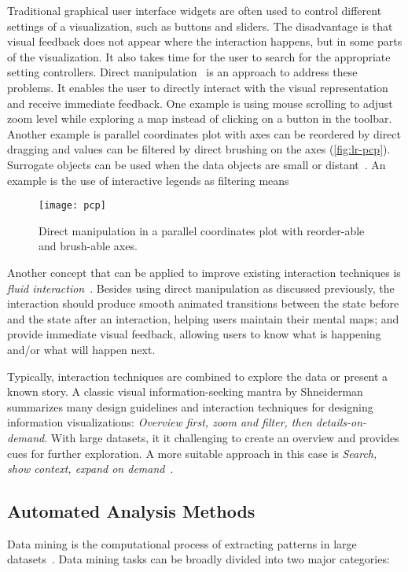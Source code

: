 Traditional graphical user interface widgets are often used to control different settings of a visualization, such as buttons and sliders. The disadvantage is that visual feedback does not appear where the interaction happens, but in some parts of the visualization. It also takes time for the user to search for the appropriate setting controllers. Direct manipulation~\cite{Shneiderman1982} is an approach to address these problems. It enables the user to directly interact with the visual representation and receive immediate feedback. One example is using mouse scrolling to adjust zoom level while exploring a map instead of clicking on a button in the toolbar. Another example is parallel coordinates plot with axes can be reordered by direct dragging and values can be filtered by direct brushing on the axes (\autoref{fig:lr-pcp}). Surrogate objects can be used when the data objects are small or distant~\cite{Kwon2011}. An example is the use of interactive legends as filtering means~\cite{Riche2010b}

\begin{figure}[!htb]
	\centering
	\texttt{[image: pcp]}
	\caption{Direct manipulation in a parallel coordinates plot with reorder-able and brush-able axes.}
	\label{fig:lr-pcp}
\end{figure}

Another concept that can be applied to improve existing interaction techniques is \emph{fluid interaction}~\cite{Elmqvist2011}. Besides using direct manipulation as discussed previously, the interaction should produce smooth animated transitions between the state before and the state after an interaction, helping users maintain their mental maps; and provide immediate visual feedback, allowing users to know what is happening and/or what will happen next.

Typically, interaction techniques are combined to explore the data or present a known story. A classic visual information-seeking mantra by Shneiderman~\cite{Shneiderman1996} summarizes many design guidelines and interaction techniques for designing information visualizations: \emph{Overview first, zoom and filter, then details-on-demand}. With large datasets, it it challenging to create an overview and provides cues for further exploration. A more suitable approach in this case is \emph{Search, show context, expand on demand}~\cite{VanHam2009}.

\subsection{Automated Analysis Methods}
Data mining is the computational process of extracting patterns in large datasets~\cite{Tan2006}. Data mining tasks can be broadly divided into two major categories:

